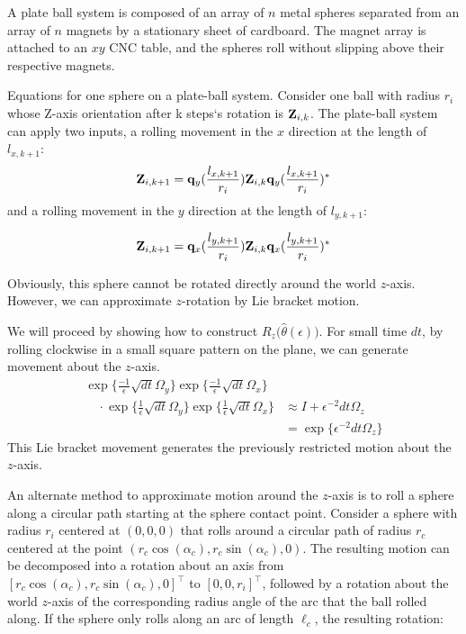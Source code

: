 \documentclass[letter paper, 10pt, conference]{ieeeconf}
\begin{document}
A plate ball system is composed of an array of $n$ metal spheres separated from an array of $n$ magnets by a stationary sheet of cardboard.  The magnet array is attached to an $xy$ CNC table, and the spheres roll without slipping above their respective magnets.



Equations for one sphere on a plate-ball system.  Consider one ball with radius $r_i$ whose Z-axis orientation after k steps`s rotation is ${\bf Z}_{i,k}$.  The plate-ball system can apply two inputs, a rolling movement in the $x$ direction at the length of $l_{x,k+1}$:
\begin{align}
{\bf Z}_{i,k+1}={\bf q}_y(\frac{l_{x,k+1}}{r_i}){\bf Z}_{i,k}{\bf q}_y(\frac{l_{x,k+1}}{r_i})^* \label{eq:PlateBallXrotation}
\end{align}
 and a rolling movement in the $y$ direction at the length of $l_{y,k+1}$:


\begin{align}
{\bf Z}_{i,k+1}={\bf q}_x(\frac{l_{y,k+1}}{r_i}){\bf Z}_{i,k}{\bf q}_x(\frac{l_{y,k+1}}{r_i})^* \label{eq:PlateBallYrotations}
\end{align}

Obviously, this sphere cannot be rotated directly around the world $z$-axis.  However, we can approximate $z$-rotation by Lie bracket motion.

We will proceed by showing how to construct $R_z\!\big(\hat\theta(\epsilon)\big)$.
For small time $dt$, by rolling clockwise in a small square pattern on the plane, we can generate movement about the $z$-axis.
\begin{align*}
\exp\{\frac{-1}{\epsilon} \sqrt{dt} \Omega_y\}
  		    \exp\{\frac{-1}{\epsilon} \sqrt{dt} \Omega_x\}&  \\
	\quad \cdot		     \exp\{\frac{1}{\epsilon} \sqrt{dt} \Omega_y\}  
		      \exp\{\frac{1}{\epsilon} \sqrt{dt} \Omega_x\} &\approx  I + \epsilon^{-2} dt \Omega_z\\
	  &=  \exp\{ \epsilon^{-2} dt  \Omega_z\}
\end{align*}
This Lie bracket movement generates the previously restricted motion about the $z$-axis.	    

An alternate method to approximate motion around the $z$-axis is to roll a sphere  along a circular path starting at the sphere contact point.
Consider a sphere with radius $r_i$ centered at $(0,0,0)$ that rolls around a circular path of radius $r_c$ centered at the point $ (r_c\cos(\alpha_c), r_c\sin(\alpha_c),0)$.  The resulting motion can be decomposed into a rotation about an axis from $[ r_c \cos(\alpha_c), r_c\sin(\alpha_c),0]^\top$ to $[ 0,0,r_i]^\top$, followed by a rotation about the world $z$-axis of the corresponding radius angle of the arc that the ball rolled along.
If the sphere only rolls along an arc of length $\ell_c$, the resulting rotation:
\end{document}
